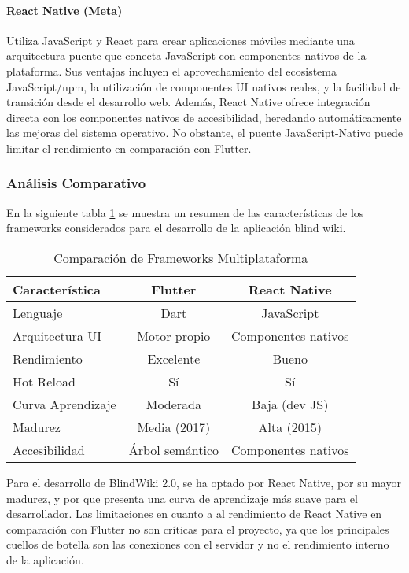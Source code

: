 \paragraph{React Native (Meta)}
Utiliza JavaScript y React para crear aplicaciones móviles mediante una arquitectura puente que conecta JavaScript con componentes nativos de la plataforma. Sus ventajas incluyen el aprovechamiento del ecosistema JavaScript/npm, la utilización de componentes UI nativos reales, y la facilidad de transición desde el desarrollo web. Además, React Native ofrece integración directa con los componentes nativos de accesibilidad, heredando automáticamente las mejoras del sistema operativo. No obstante, el puente JavaScript-Nativo puede limitar el rendimiento en comparación con Flutter.


\subsubsection{Análisis Comparativo}
En la siguiente tabla \ref{tab:framework-comparison} se muestra un resumen de las características de los frameworks considerados para el desarrollo de la aplicación blind wiki.
\begin{table}[ht]
    \centering
    \caption{Comparación de Frameworks Multiplataforma}
    \label{tab:framework-comparison}
    \begin{tabular}{|l|c|c|}
        \hline
        \textbf{Característica} & \textbf{Flutter} & \textbf{React Native} \\
        \hline
        Lenguaje & Dart & JavaScript \\
        \hline
        Arquitectura UI & Motor propio & Componentes nativos \\
        \hline
        Rendimiento & Excelente & Bueno \\
        \hline
        Hot Reload & Sí & Sí \\
        \hline
        Curva Aprendizaje & Moderada & Baja (dev JS) \\
        \hline
        Madurez & Media (2017) & Alta (2015) \\
        \hline
        Accesibilidad & Árbol semántico & Componentes nativos \\
        \hline
    \end{tabular}
\end{table}

Para el desarrollo de BlindWiki 2.0, se ha optado por React Native, por su mayor madurez, y por que presenta una curva de aprendizaje más suave para el desarrollador. Las limitaciones en cuanto a al rendimiento de React Native en comparación con Flutter no son críticas para el proyecto, ya que los principales cuellos de botella son las conexiones con el servidor y no el rendimiento interno de la aplicación.

